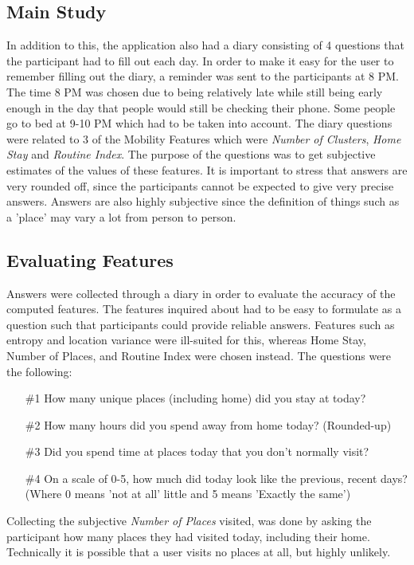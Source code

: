 \subsection{Main Study}
In addition to this, the application also had a diary consisting of 4 questions that the participant had to fill out each day. In order to make it easy for the user to remember filling out the diary, a reminder was sent to the participants at 8 PM. The time 8 PM was chosen due to being relatively late while still being early enough in the day that people would still be checking their phone. Some people go to bed at 9-10 PM which had to be taken into account. The diary questions were related to 3 of the Mobility Features which were \textit{Number of Clusters}, \textit{Home Stay} and \textit{Routine Index}. The purpose of the questions was to get subjective estimates of the values of these features. It is important to stress that answers are very rounded off, since the participants cannot be expected to give very precise answers. Answers are also highly subjective since the definition of things such as a 'place' may vary a lot from person to person.

\subsection{Evaluating Features}
Answers were collected through a diary in order to evaluate the accuracy of the computed features. The features inquired about had to be easy to formulate as a question such that participants could provide reliable answers. Features such as entropy and location variance were ill-suited for this, whereas Home Stay, Number of Places, and Routine Index were chosen instead. The questions were the following:

\begin{itemize}
    \item[\#1] How many unique places (including home) did you stay at today?
    \item[\#2] How many hours did you spend away from home today? (Rounded-up)
    \item[\#3] Did you spend time at places today that you don't normally visit?
    \item[\#4] On a scale of 0-5, how much did today look like the previous, recent days? (Where 0 means 'not at all' little and 5 means 'Exactly the same')
\end{itemize}

Collecting the subjective \textit{Number of Places} visited, was done by asking the participant how many places they had visited today, including their home. Technically it is possible that a user visits no places at all, but highly unlikely.\\

